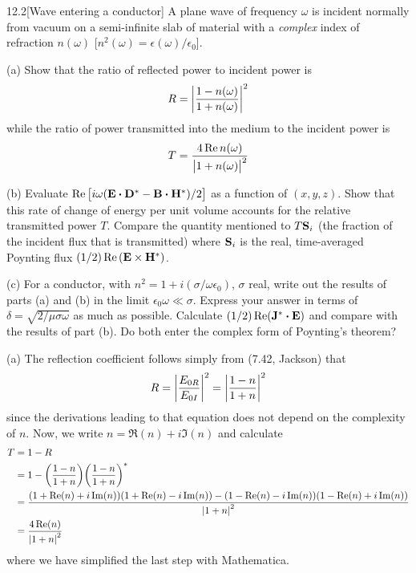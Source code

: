 \documentclass[12pt]{article}
\begin{document}
\begin{problem}{12.2}[Wave entering a conductor]
A plane wave of frequency $\omega$ is incident normally from vacuum on a
semi-infinite slab of material with a \textit{complex} index of refraction
$n(\omega)$ [$n^2(\omega)=\epsilon(\omega)/\epsilon_0$].

(a) Show that the ratio of reflected power to incident power is
\begin{equation}
    R=\abs{\frac{1-n(\omega)}{1+n(\omega)}}^2 
\end{equation}
while the ratio of power transmitted into the medium to the incident power is 
\begin{equation}
    T=\frac{4\Re n(\omega)}{\abs{1+n(\omega)}^2} 
\end{equation}

(b) Evaluate $\Re\qty[i\omega(\vb{E}\vdot\vb{D}^\ast-\vb{B}\vdot\vb{H}^\ast)/2]$
as a function of $(x,y,z)$. Show that this rate of change of energy per unit
volume accounts for the relative transmitted power $T$. Compare the quantity
mentioned to $T\vb{S}_i$ (the fraction of the incident flux that is transmitted)
where $\vb{S}_i$ is the real, time-averaged Poynting flux
$(1/2)\Re\qty(\vb{E}\times\vb{H}^\ast)$.

(c) For a conductor, with $n^2=1+i(\sigma/\omega\epsilon_0)$, $\sigma$ real,
write out the results of parts (a) and (b) in the limit
$\epsilon_0\omega\ll\sigma$. Express your answer in terms of
$\delta=\sqrt{2/\mu\sigma\omega}$ as much as
possible. Calculate $(1/2)\Re(\vb{J}^\ast\vdot\vb{E})$ and compare with the
results of part (b). Do both enter the complex form of Poynting's theorem?
\begin{solution}
    (a) The reflection coefficient follows simply from (7.42, Jackson) that
\begin{equation}
    R=\abs{\frac{E_{0R}}{E_{0I}}}^2
    =\abs{\frac{1-n}{1+n}}^2
\end{equation}
since the derivations leading to that equation does not depend on the complexity
of $n$. Now, we write $n=\Re(n)+i\Im(n)$ and calculate
\begin{align}
    T&=1-R\notag\\
     &=1-\qty(\frac{1-n}{1+n})\qty(\frac{1-n}{1+n})^\ast\notag\\
     &=\frac{(1+\Re(n)+i\Im(n))(1+\Re(n)-i\Im(n))-(1-\Re(n)-i\Im(n))(1-\Re(n)+i\Im(n))}{\abs{1+n}^2}\notag\\
     &=\frac{4\Re(n)}{\abs{1+n}^2}
\end{align}
where we have simplified the last step with Mathematica.


\end{solution}
\end{problem}
\end{document}
